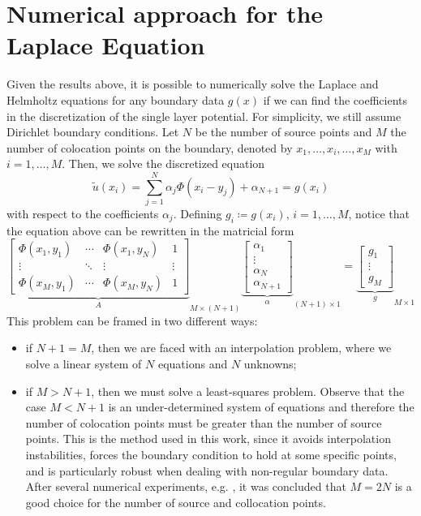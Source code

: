 \section{Numerical approach for the Laplace Equation}\label{n_a_MFS_lap}
Given the results above, it is possible to numerically solve the Laplace and Helmholtz equations for any boundary data \(g(x)\) if we can find the coefficients in the discretization of the single layer potential. For simplicity, we still assume Dirichlet boundary conditions. Let \(N\) be the number of source points and \(M\) the number of colocation points on the boundary, denoted by \(x_1,\dots,x_i,\dots,x_M\) with \(i=1,\dots, M\). Then, we solve the discretized equation
\[
    \tilde{u}(x_i) = \sum_{j=1}^{N} \alpha_j \Phi(x_i-y_j) + \alpha_{N+1} = g(x_i)    
\]
with respect to the coefficients \(\alpha_j\). Defining \(g_i \coloneq g(x_i), \, i=1,\dots, M\), notice that the equation above can be rewritten in the matricial form
\begin{equation}\label{MFS_m_system}
    {\underbrace{\begin{bmatrix}
        \Phi(x_1, y_1) & \cdots & \Phi(x_1, y_N) & 1 \\
        \vdots & \ddots & \vdots & \vdots\\
        \Phi(x_M, y_1) & \cdots & \Phi(x_M, y_N) & 1
    \end{bmatrix}}_{A}}_{M\times (N+1)}
    {\underbrace{\begin{bmatrix}
        \alpha_1\\
        \vdots\\
        \alpha_N\\
        \alpha_{N+1}
    \end{bmatrix}}_\alpha}_{(N+1)\times 1}
    =
    {\underbrace{\begin{bmatrix}
        g_1\\
        \vdots\\
        g_M
    \end{bmatrix}}_g}_{M\times 1}
\end{equation}
This problem can be framed in two different ways:
\begin{itemize}
    \item if \(N+1=M\), then we are faced with an interpolation problem, where we solve a linear system of \(N\) equations and \(N\) unknowns;
    \item if \(M > N+1\), then we must solve a least-squares problem. Observe that the case \(M < N+1\) is an under-determined system of equations and therefore the number of colocation points must be greater than the number of source points. This is the method used in this work, since it avoids interpolation instabilities, forces the boundary condition to hold at some specific points, and is particularly robust when dealing with non-regular boundary data.  After several numerical experiments, e.g. \cite{alves2009choice}, it was concluded that \(M=2N\) is a good choice for the number of source and collocation points.
\end{itemize}

